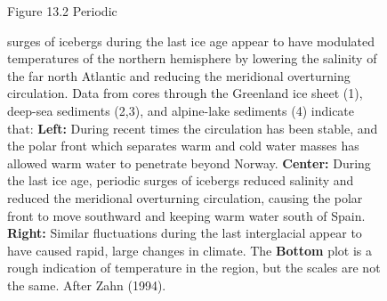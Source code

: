 \begin{enumerate}
\begin{figure}[t!]
\footnotesize
Figure 13.2 Periodic \rule{0mm}{3ex}surges of icebergs during the last
ice age appear to have modulated temperatures of the northern
hemisphere by lowering the salinity of the far north Atlantic and
reducing the meridional overturning
circulation. Data from cores
through the Greenland ice sheet (1), deep-sea sediments (2,3), and
alpine-lake sediments (4) indicate that: \textbf{Left:} During recent
times the circulation has been stable, and the polar front which
separates warm and cold water masses has allowed warm water to
penetrate beyond Norway.  \textbf{Center:} During the last ice age,
periodic surges of icebergs reduced salinity and reduced the
meridional overturning circulation, causing the polar front to move
southward and keeping warm water south of Spain.  \textbf{Right:}
Similar fluctuations during the last interglacial appear to have
caused rapid, large changes in climate. The \textbf{Bottom} plot is a
rough indication of temperature in the region, but the scales are not
the same. After Zahn (1994).
\label{fig:NAiceage}
\vspace{-3ex}
\end{figure}


\end{enumerate}
